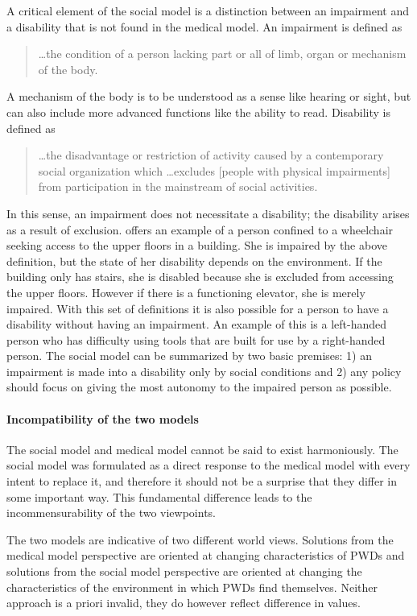 \documentclass[a4paper]{article}
\begin{document}
A critical element of the social model is a distinction between an impairment
and a disability that is not found in the medical model. An impairment is
defined as 
%
\begin{quote}
    \ldots the condition of a person lacking part or all of limb, organ or mechanism
    of the body.
\end{quote}
%
A mechanism of the body is to be understood as a sense like hearing or sight,
but can also include more advanced functions like the ability to read.
Disability is defined as 
%
\begin{quote}
    \ldots the disadvantage or restriction of activity caused by a contemporary
    social organization which \ldots excludes [people with physical
    impairments] from participation in the mainstream of social activities.
\end{quote}
%
In this sense, an impairment does not necessitate a disability; the disability
arises as a result of exclusion. \cite{winter2003development} offers an
example of a person confined to a wheelchair seeking access to the upper
floors in a building. She is impaired by the above definition, but the state
of her disability depends on the environment. If the building only has stairs,
she is disabled because she is excluded from accessing the upper floors.
However if there is a functioning elevator, she is merely impaired. With this
set of definitions it is also possible for a person to have a disability
without having an impairment. An example of this is a left-handed person who
has difficulty using tools that are built for use by a right-handed person.
The social model can be summarized by two basic premises: 1) an impairment is
made into a disability only by social conditions and 2) any policy should
focus on giving the most autonomy to the impaired person as possible.

\paragraph{Incompatibility of the two models}

The social model and medical model cannot be said to exist harmoniously. The
social model was formulated as a direct response to the medical model with
every intent to replace it, and therefore it should not be a surprise that
they differ in some important way. This fundamental difference leads to the
incommensurability of the two viewpoints. 

The two models are indicative of two different world views. Solutions from the
medical model perspective are oriented at changing characteristics of PWDs and
solutions from the social model perspective are oriented at changing the
characteristics of the environment in which PWDs find themselves. Neither
approach is a priori invalid, they do however reflect difference in values.
\end{document}
